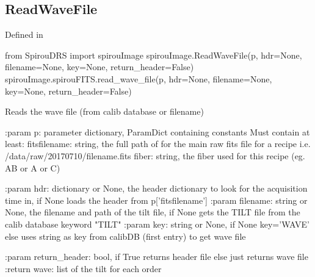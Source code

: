\noindent\begin{minipage}{\textwidth}
\subsection{ReadWaveFile}

Defined in \spirouImage{}

\begin{pythonbox}
from SpirouDRS import spirouImage
spirouImage.ReadWaveFile(p, hdr=None, filename=None, key=None, return_header=False)
spirouImage.spirouFITS.read_wave_file(p, hdr=None, filename=None, key=None, return_header=False)
\end{pythonbox}

\begin{pythondocstring}
Reads the wave file (from calib database or filename)

:param p: parameter dictionary, ParamDict containing constants
    Must contain at least:
            fitsfilename: string, the full path of for the main raw fits
                          file for a recipe
                          i.e. /data/raw/20170710/filename.fits
            fiber: string, the fiber used for this recipe (eg. AB or A or C)

:param hdr: dictionary or None, the header dictionary to look for the
                 acquisition time in, if None loads the header from
                 p['fitsfilename']
:param filename: string or None, the filename and path of the tilt file,
                 if None gets the TILT file from the calib database
                 keyword "TILT"
:param key: string or None, if None key='WAVE' else uses string as key
            from calibDB (first entry) to get wave file

:param return_header: bool, if True returns header file else just returns
                      wave file
:return wave: list of the tilt for each order
\end{pythondocstring}
\end{minipage}


